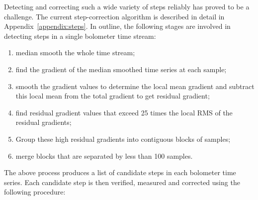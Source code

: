\documentclass[useAMS,usenatbib,nofootinbib]{mn2e}
\begin{document}
Detecting and correcting such a wide variety of steps reliably has proved
to be a challenge. The current step-correction algorithm is described in
detail in Appendix~\ref{appendix:steps}. In outline, the following stages
are involved in detecting steps in a single bolometer time stream:

\begin{enumerate}

\item median smooth the whole time stream;

\item find the gradient of the median smoothed time series at each
sample;

\item smooth the gradient values to determine the local mean gradient
and subtract this local mean from the total gradient to get residual
gradient;

\item find residual gradient values that exceed 25 times the local RMS
of the residual gradients;

\item Group these high residual gradients into contiguous blocks of
samples;

\item merge blocks that are separated by less than 100 samples.
\end{enumerate}

The above process produces a list of candidate steps in each bolometer
time series. Each candidate step is then verified, measured and corrected
using the following procedure:
\end{document}
